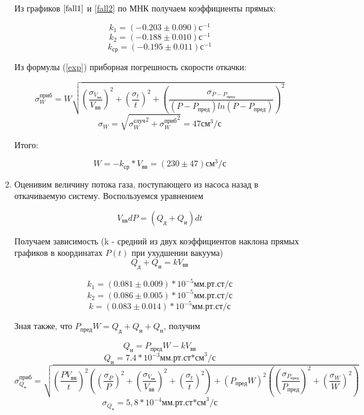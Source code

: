 \documentclass[a4paper,12pt]{article}
\begin{document}
\begin{enumerate}
    Из графиков $\ref{fall1}$ и \ref{fall2} по МНК получаем коэффициенты прямых:

        $$    k_1 = (-0.203 \pm 0.090) \text{с}^{-1}     $$
        $$    k_2 = (-0.188 \pm 0.010) \text{с}^{-1}     $$
        $$    k_{\text{ср}} = (-0.195 \pm 0.011 ) \text{с}^{-1} $$

        Из формулы (\ref{exp}) приборная погрешность скорости откачки:

        $$    \sigma_W^{\text{приб}} = W \sqrt{\left( \frac{\sigma_{V_{\text{вв}}}}{V_{\text{вв}}} \right)^2 + \left( \frac{\sigma_{t}}{t} \right)^2 + \left( \frac{\sigma_{P - P_{\text{пред}}}}{(P - P_{\text{пред}}) ln(P - P_{\text{пред}})} \right)^2}$$
        $$    \sigma_W = \sqrt{{\sigma_W^{\text{случ}}}^2 + {\sigma_W^{\text{приб}}}^2} = 47 \text{см}^3/\text{с} $$

        Итого:

        $$    W = -k_{\text{ср}} * V_{\text{вв}} = (230 \pm 47) \text{см}^3/\text{с} $$

    \item Оценивим величину потока газа, поступающего из насоса назад в откачиваемую систему.
        Воспользуемся уравнением

        $$    V_{\text{вв}} dP = (Q_{\text{д}} + Q_{\text{и}})dt $$

        Получаем зависимость (k - средний из двух коэффициентов наклона прямых графиков в координатах $P(t)$ при ухудшении вакуума)
        $$    Q_{\text{д}} + Q_{\text{и}} = k V_{\text{вв}} $$

        $$    k_1 = (0.081 \pm 0.009) * 10^{-5} \text{мм.рт.ст/с} $$
        $$    k_2 = (0.086 \pm 0.005) * 10^{-5} \text{мм.рт.ст/с} $$
        $$    k = (0.083 \pm 0.014) * 10^{-5}   \text{мм.рт.ст/с} $$

        Зная также, что $P_{\text{пред}}W = Q_{\text{д}} + Q_{\text{и}} + Q_{\text{н}}$, получим

        $$    Q_{\text{н}} = P_{\text{пред}} W - k V_{\text{вв}} $$
        $$    Q_{\text{н}} = 7.4 * 10^{-3} \text{мм.рт.ст*см}^3/\text{с} $$
        $$    \sigma_{Q_{\text{н}}}^{приб} = \sqrt{ \left( \frac{P V_{\text{вв}}}{t} \right)^2 \left( \left( \frac{\sigma_P}{P} \right)^2 + \left( \frac{\sigma_{V_{\text{вв}}}}{V_{\text{вв}}} \right)^2 + \left( \frac{\sigma_t}{t} \right)^2 \right) + \left( P_{\text{пред}} W \right)^2 \left( \left( \frac{\sigma_{P_{\text{пред}}}}{P_{\text{пред}}} \right)^2 + \left( \frac{\sigma_W}{W} \right)^2 \right)}$$
        $$    \sigma_{Q_{\text{н}}} = 5,8 * 10^{-4} \text{мм.рт.ст*см}^3/\text{с}$$


\end{enumerate}
\end{document}
